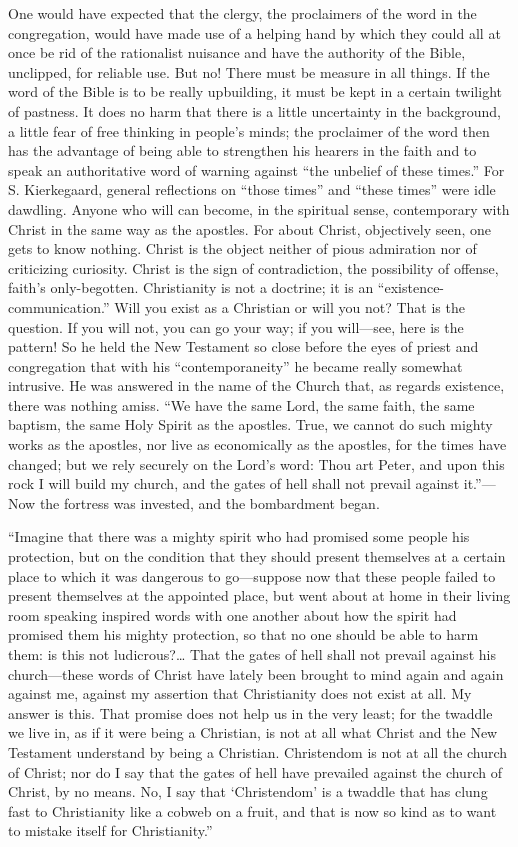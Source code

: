 \documentclass[12pt,a4paper,openany]{book}
\newcommand{\opage}[1]{\marginnote{\footnotesize\textit{[#1]}}}
\begin{document}
One would have expected that the clergy, the proclaimers of the word in
the congregation, would have made use of a helping hand by which they
could all at once be rid of the rationalist nuisance and have the
authority of the Bible, unclipped, for reliable use. But no! There must
be measure in all things. If the word of the Bible is to be really
upbuilding, it must be kept in a certain twilight of pastness. It does no
harm that there is a little uncertainty in the \opage{63}background, a little fear
of free thinking in people's minds; the proclaimer of the word then has
the advantage of being able to strengthen his hearers in the faith and to
speak an authoritative word of warning against ``the unbelief of these
times.'' For S. Kierkegaard, general reflections on ``those times'' and
``these times'' were idle dawdling. Anyone who will can become, in the
spiritual sense, contemporary with Christ in the same way as the
apostles. For about Christ, objectively seen, one gets to know nothing.
Christ is the object neither of pious admiration nor of criticizing
curiosity. Christ is the sign of contradiction, the possibility of
offense, faith's only-begotten. Christianity is not a doctrine; it is an
``existence-communication.'' Will you exist as a Christian or will you
not? That is the question. If you will not, you can go your way; if you
will---see, here is the pattern! So he held the New Testament so close
before the eyes of priest and congregation that with his
``contemporaneity'' he became really somewhat intrusive. He was answered
in the name of the Church that, as regards existence, there was nothing
amiss. ``We have the same Lord, the same faith, the same baptism, the
same Holy Spirit as the apostles. True, we cannot do such mighty works as
the apostles, nor live as economically as the apostles, for the times
have changed; but we rely securely on the Lord's word: Thou art Peter,
and upon this rock I will build my church, and the gates of hell shall
not prevail against it.''---Now the fortress was invested, and the
bombardment began.

``Imagine that there was a mighty spirit who had promised some people his
protection, but on the condition that they should present themselves at
a certain place \opage{64}to which it was dangerous to go---suppose now that these
people failed to present themselves at the appointed place, but went
about at home in their living room speaking inspired words with one
another about how the spirit had promised them his mighty protection, so
that no one should be able to harm them: is this not ludicrous?\dots{} That
the gates of hell shall not prevail against his church---these words of
Christ have lately been brought to mind again and again against me,
against my assertion that Christianity does not exist at all. My answer
is this. That promise does not help us in the very least; for the twaddle
we live in, as if it were being a Christian, is not at all what Christ
and the New Testament understand by being a Christian. Christendom is not
at all the church of Christ; nor do I say that the gates of hell have
prevailed against the church of Christ, by no means. No, I say that
`Christendom' is a twaddle that has clung fast to Christianity like a
cobweb on a fruit, and that is now so kind as to want to mistake itself
for Christianity.''
\end{document}
